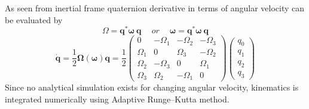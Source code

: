 As seen from inertial frame quaternion derivative in terms of angular velocity can be evaluated by
\begin{equation*}
\Omega =\mathbf{q}^{*}\mathbf{\omega \ q} \ \quad or\ \mathbf{\quad \omega } =\mathbf{q}^{*}\mathbf{\omega \ q}
\end{equation*}
\begin{equation}
\dot{\mathbf{q}} =\frac{1}{2}\mathbf{\Omega }(\mathbf{\omega })\mathbf{q} =\frac{1}{2}\begin{pmatrix}
0 & -\Omega _{1} & -\Omega _{2} & -\Omega _{3}\\
\Omega _{1} & 0 & \Omega _{3} & -\Omega _{2}\\
\Omega _{2} & -\Omega _{3} & 0 & \Omega _{1}\\
\Omega _{3} & \Omega _{2} & -\Omega _{1} & 0
\end{pmatrix}\begin{pmatrix}
q_{0}\\
q_{1}\\
q_{2}\\
q_{3}
\end{pmatrix}
\end{equation}
Since no analytical simulation exists for changing angular velocity, kinematics is integrated numerically using Adaptive Runge–Kutta method.
 